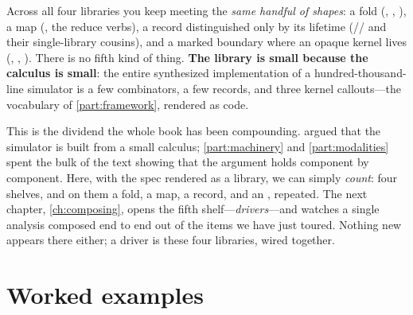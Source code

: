 \begin{keyidea}
Across all four libraries you keep meeting the \emph{same handful of shapes}: a
fold (, , ), a map
(, the reduce verbs), a record distinguished only by its
lifetime (// and their single-library
cousins), and a marked  boundary where an opaque kernel lives
(, , ). There is no
fifth kind of thing. \textbf{The library is small because the calculus is small}:
the entire synthesized implementation of a hundred-thousand-line simulator is a few
combinators, a few records, and three kernel callouts---the vocabulary of
\cref{part:framework}, rendered as code.
\end{keyidea}

This is the dividend the whole book has been compounding. 
argued that the simulator is built from a small calculus; \cref{part:machinery} and
\cref{part:modalities} spent the bulk of the text showing that the argument holds
component by component. Here, with the spec rendered as a library, we can simply
\emph{count}: four shelves, and on them a fold, a map, a record, and an
, repeated. The next chapter, \cref{ch:composing}, opens the fifth
shelf---\emph{drivers}---and watches a single analysis composed end to end out of
the items we have just toured. Nothing new appears there either; a driver is these
four libraries, wired together.

\section{Worked examples}

